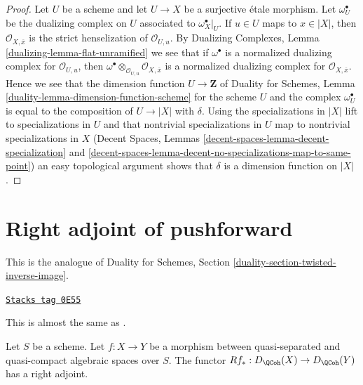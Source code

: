 \begin{proof}
Let $U$ be a scheme and let $U \to X$ be a surjective \'etale morphism.
Let $\omega_U^\bullet$ be the dualizing complex on $U$ associated
to $\omega_X^\bullet|_U$.
If $u \in U$ maps to $x \in |X|$, then $\mathcal{O}_{X, \overline{x}}$
is the strict henselization of $\mathcal{O}_{U, u}$. By
Dualizing Complexes, Lemma \ref{dualizing-lemma-flat-unramified}
we see that if $\omega^\bullet$ is a normalized dualizing complex
for $\mathcal{O}_{U, u}$, then
$\omega^\bullet \otimes_{\mathcal{O}_{U, u}} \mathcal{O}_{X, \overline{x}}$
is a normalized dualizing complex for $\mathcal{O}_{X, \overline{x}}$.
Hence we see that the dimension function $U \to \mathbf{Z}$ of
Duality for Schemes, Lemma \ref{duality-lemma-dimension-function-scheme}
for the scheme $U$ and the complex
$\omega_U^\bullet$ is equal to the composition of $U \to |X|$ with $\delta$.
Using the specializations in $|X|$ lift to specializations in $U$
and that nontrivial specializations in $U$ map to
nontrivial specializations in $X$
(Decent Spaces, Lemmas \ref{decent-spaces-lemma-decent-specialization} and
\ref{decent-spaces-lemma-decent-no-specializations-map-to-same-point})
an easy topological argument shows that $\delta$ is a dimension function
on $|X|$.
\end{proof}

\section{Right adjoint of pushforward}
\label{spaces-duality-section-twisted-inverse-image}
This is the analogue of Duality for Schemes, Section
\ref{duality-section-twisted-inverse-image}.

\begin{lemma}
\label{spaces-duality-lemma-twisted-inverse-image}
\href{https://stacks.math.columbia.edu/tag/0E55}{\texttt{Stacks tag 0E55}}

\begin{reference}
This is almost the same as \cite[Example 4.2]{Neeman-Grothendieck}.
\end{reference}
Let $S$ be a scheme.
Let $f : X \to Y$ be a morphism between quasi-separated and quasi-compact
algebraic spaces over $S$. The functor $Rf_* : D_\QCoh(X) \to D_\QCoh(Y)$
has a right adjoint.
\end{lemma}

